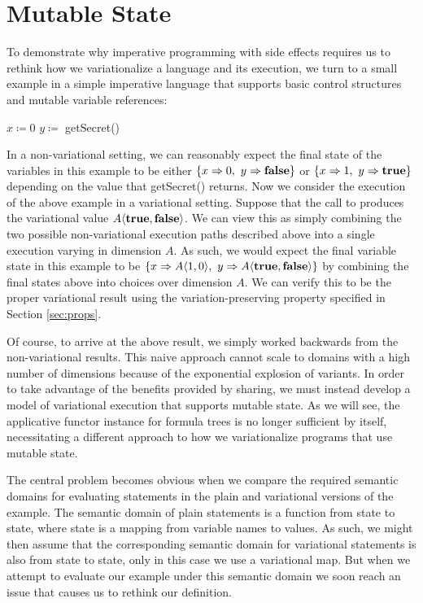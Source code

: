\documentclass[12pt,oneside]{book}
\begin{document}
\section{Mutable State}
\label{sec:mutst}

To demonstrate why imperative programming with side effects requires us to rethink how we
variationalize a language and its execution, we turn to a small example in a simple imperative
language that supports basic control structures and mutable variable references:

\begin{samepage}
\begin{algorithmic}
\STATE $x \coloneqq 0$
\STATE $y \coloneqq$ getSecret()
\ENDIF
\end{algorithmic}
\end{samepage}

In a non-variational setting, we can reasonably expect the final state of the variables in this example
to be either $\{x \Rightarrow 0,\ y \Rightarrow \textbf{\textup{\textrm{false}}}\}$ or
$\{x \Rightarrow 1,\ y \Rightarrow \textbf{\textup{\textrm{true}}}\}$ depending on the value that
getSecret() returns. Now we consider the execution of the above example in a variational
setting. Suppose that the call to 
produces the variational value $A \langle \textbf{\textup{\textrm{true}}}, \textbf{\textup{\textrm{false}}} \rangle$. We can view this as simply
combining the two possible non-variational execution paths described above into a
single execution varying in dimension $A$. As such, we would expect the final variable state
in this example to be  $\{x \Rightarrow A \langle 1, 0 \rangle,\ y \Rightarrow A \langle \textbf{\textup{\textrm{true}}}, \textbf{\textup{\textrm{false}}} \rangle\}$ by combining the final states above into choices over dimension $A$. We can verify this to be the proper variational result using the variation-preserving property
specified in Section \ref{sec:props}.

Of course, to arrive at the above result, we simply worked backwards from the non-variational
results. This naive approach cannot scale to domains with a high number of dimensions because of the exponential
explosion of variants. In order to take advantage of the benefits provided by sharing, we must instead develop a model
of variational execution that supports mutable state.  As we will see, the applicative functor instance for
formula trees is no longer sufficient by itself, necessitating a different approach to how we variationalize programs
that use mutable state.

The central problem becomes obvious when we compare the required semantic domains for evaluating statements
in the plain and variational versions of the example. The semantic domain of plain statements is a function from state to
state, where state is a mapping from variable names to values. As such, we might then assume that the corresponding
semantic domain for variational statements is also from state to state, only in this case we use a variational map. But when
we attempt to evaluate our example under this semantic domain we soon reach an issue that causes us to rethink our definition.
\end{document}
